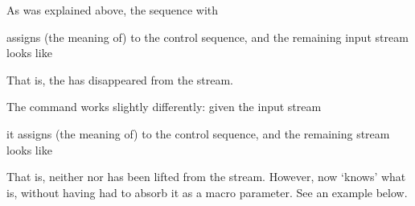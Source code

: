 As was explained above, the sequence with 
\begin{disp}%
       \end{disp}
assigns (the meaning of)  to the control sequence, 
and the remaining input stream looks like
\begin{disp}\end{disp}
That is, the  has disappeared from the stream.

The command  works slightly differently:
given the input stream
\begin{disp}%
       \end{disp}
it assigns (the meaning of)  to the control sequence, 
and the remaining stream looks like
\begin{disp}\end{disp}
That is, neither  nor  has
been lifted from the stream.
However, now 
`knows' what  is, without having had to absorb it
as a macro parameter. See an example below.

